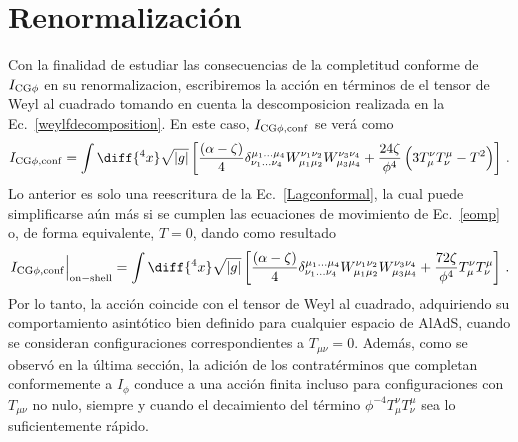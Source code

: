 \documentclass[../Main.tex]{subfiles}
\begin{document}
\section{Renormalización}
Con la finalidad de estudiar las consecuencias de la completitud conforme de $I_{\rm CG\phi}$ en su renormalizacion, escribiremos la acción en términos de el tensor de Weyl al cuadrado tomando en cuenta la descomposicion realizada en la Ec.~\eqref{weylfdecomposition}. En este caso, $I_{\rm CG\phi,conf}$ se verá como 
\begin{equation}\label{LagSigmaT}
    I_{\rm CG\phi,conf} = \int\diff{^4x}\sqrt{|g|}\left[ \frac{(\alpha-\zeta)}{4}\delta^{\mu_1\ldots\mu_4}_{\nu_1\ldots\nu_4}W^{\nu_1\nu_2}_{\mu_1\mu_2}W^{\nu_3\nu_4}_{\mu_3\mu_4} + \frac{24\zeta}{\phi^4}\left(3 T_{\mu}^{\nu}T_{\nu}^{\mu}-T^2\right)\right]\,.
\end{equation}
Lo anterior es solo una reescritura de la  Ec.~\eqref{Lagconformal}, la cual puede simplificarse aún más si se cumplen las ecuaciones de movimiento de Ec.~\eqref{eomp} o, de forma equivalente, $T=0$, dando como resultado
\begin{equation}\label{LagSigmaTon-shell}
I_{\rm CG\phi,conf}\Big|_{\rm on-shell} = \int\diff{^4x}\sqrt{|g|}\left[ \frac{(\alpha-\zeta)}{4}\delta^{\mu_1\ldots\mu_4}_{\nu_1\ldots\nu_4}W^{\nu_1\nu_2}_{\mu_1\mu_2}W^{\nu_3\nu_4}_{\mu_3\mu_4} + \frac{72\zeta}{\phi^4}T_{\mu}^{\nu}T_{\nu}^{\mu}\right]\,.
\end{equation}
Por lo tanto, la acción coincide con el tensor de Weyl al cuadrado, adquiriendo su comportamiento asintótico bien definido para cualquier espacio de AlAdS, cuando se consideran configuraciones correspondientes a $T_{\mu\nu}=0$. Además, como se observó en la última sección, la adición de los contratérminos que completan conformemente a $I_{\phi}$ conduce a una acción finita incluso para configuraciones con $T_{\mu \nu}$ no nulo, siempre y cuando el decaimiento del término $\phi^{-4}T_{\mu}^{\nu}T_{\nu}^{\mu}$ sea lo suficientemente rápido.
\end{document}
